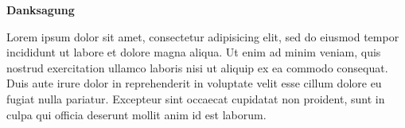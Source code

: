\thispagestyle{empty}

\noindent
{\Large \bfseries Danksagung}
\vspace{\baselineskip}

\noindent
Lorem ipsum dolor sit amet, consectetur adipisicing elit, sed do eiusmod
tempor incididunt ut labore et dolore magna aliqua. Ut enim ad minim veniam,
quis nostrud exercitation ullamco laboris nisi ut aliquip ex ea commodo
consequat. Duis aute irure dolor in reprehenderit in voluptate velit esse
cillum dolore eu fugiat nulla pariatur. Excepteur sint occaecat cupidatat non
proident, sunt in culpa qui officia deserunt mollit anim id est laborum.